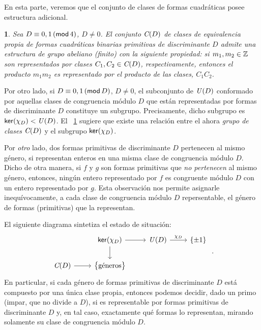 \theoremstyle{plain}
\newtheorem{teoMotivaComposicion}{\teoname}[section]
\newtheorem{lemaMotivaComposicion}[teoMotivaComposicion]{\lemaname}

\theoremstyle{definition}
\newtheorem{obsMotivaComposicion}[teoMotivaComposicion]{\obsname}


En esta parte, veremos que el conjunto de clases de formas cuadr\'aticas
posee estructura adicional.

\begin{teoMotivaComposicion}\label{teo:motiva:composicion}
	Sea $D\equiv 0,1\tmodulo[4]$, $D\neq 0$.
	El conjunto $\Clases(D)$ de clases de equivalencia propia
	de formas cuadr\'aticas binarias primitivas de discriminante $D$
	admite una estructura de grupo abeliano (finito) con la siguiente
	propiedad: si $m_1,m_2\in\Enteros$ son representados por clases
	$C_1,C_2\in\Clases(D)$, respectivamente, entonces el producto
	$m_1m_2$ es representado por el producto de las clases, $C_1C_2$.
\end{teoMotivaComposicion}

Por otro lado, si $D\equiv 0,1\tmodulo[D]$, $D\neq 0$, el subconjunto
de $\Unidadesmod(D)$ conformado por aquellas clases de congruencia
m\'odulo $D$ que est\'an representadas por formas de discriminante
$D$ constituye un subgrupo. Precisamente, dicho subgrupo es
$\ker(\varkronecker[D])\subgrp\Unidadesmod(D)$.
El \teoname~\ref{teo:motiva:composicion} sugiere que existe una
relaci\'on entre el ahora \emph{grupo de clases} $\Clases(D)$ y
el subgrupo $\ker(\varkronecker[D])$.

Por \emph{otro} lado, dos formas primitivas de discriminante $D$
pertenecen al mismo g\'enero, si representan enteros en una misma
clase de congruencia m\'odulo $D$. Dicho de otra manera, si $f$ y $g$
son formas primitivas que \emph{no pertenecen} al mismo g\'enero,
entonces, ning\'un entero representado por $f$ es congruente
m\'odulo $D$ con un entero representado por $g$. Esta observaci\'on
nos permite asignarle inequ\'ivocamente, a cada clase de congruencia
m\'odulo $D$ repersentable, el g\'enero de formas (primitivas) que la
representan.

El siguiente diagrama sintetiza el estado de situaci\'on:
\begin{displaymath}
	\begin{tikzcd}
		& \ker(\varkronecker[D]) \arrow[r] \arrow[d] &
			\Unidadesmod(D) \arrow[r,"{\varkronecker[D]}"] &
			\cuadratico \\
		\Clases(D) \arrow[r] & \big\{\text{g\'eneros}\big\} & &
	\end{tikzcd}
	\dispstop
\end{displaymath}
%
En particular, si cada g\'enero de formas primitivas de discriminante $D$
est\'a compuesto por una \'unica clase propia, entonces podemos decidir,
dado un primo (impar, que no divide a $D$), si es representable
por formas primitivas de discriminante $D$ y, en tal caso, exactamente
qu\'e formas lo representan, mirando solamente su clase de congruencia
m\'odulo $D$.

